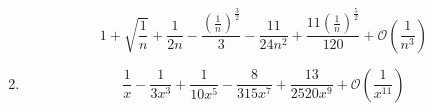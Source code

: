 \begin{solution}
\begin{enumerate}[label=(\alph*)]
\begin{mapleinput}
\end{mapleinput} \begin{mapleoutput}
    \[1+\sqrt{\frac{1}{n}}+\frac{1}{2 n}-\frac{\left(\frac{1}{n}\right)^{\frac{3}{2}}}{3}-\frac{11}{24 n^{2}}+\frac{11 \left(\frac{1}{n}\right)^{\frac{5}{2}}}{120}+\mathcal{O}\left(\frac{1}{n^{3}}\right)\]
\end{mapleoutput} \item \begin{mapleinput}
\end{mapleinput} \begin{mapleoutput}
    \[\frac{1}{x}-\frac{1}{3 x^{3}}+\frac{1}{10 x^{5}}-\frac{8}{315 x^{7}}+\frac{13}{2520 x^{9}}+\mathcal{O}\left(\frac{1}{x^{11}}\right)\]
\end{mapleoutput}
    \end{enumerate}
\end{solution}